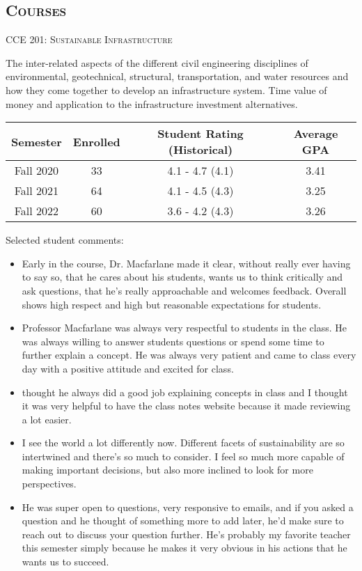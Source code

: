 \documentclass[margin,line]{res}
\newif\ifdetail
\newcommand{\secfont}{\scshape }
\newcommand{\acc}{\scshape }
\begin{document}
\begin{resume}
\section{\secfont Courses}

{\acc CCE 201: Sustainable Infrastructure}

\vspace{-.4cm}
The inter-related aspects of the different civil engineering disciplines of
environmental, geotechnical, structural, transportation, and water resources and
how they come together to develop an infrastructure system. Time value of money
and application to the infrastructure investment alternatives.


\ifdetail
\begin{tabular}{cccc}
  \toprule
  Semester & Enrolled & Student Rating (Historical) & Average GPA\\
  \midrule
  Fall 2020 & 33 & 4.1 - 4.7 (4.1)& 3.41 \\
  Fall 2021 & 64 & 4.1 - 4.5 (4.3)& 3.25 \\
  Fall 2022 & 60 & 3.6 - 4.2 (4.3)& 3.26 \\
  \bottomrule
\end{tabular}

Selected student comments:
\begin{itemize}
  \item Early in the course, Dr. Macfarlane made it clear, without really ever
    having to say so, that he cares about his students, wants us to think
    critically and ask questions, that he's really approachable and welcomes
    feedback. Overall shows high respect and high but reasonable expectations
    for students.
  \item Professor Macfarlane was always very respectful to students in the class. He
    was always willing to answer students questions or spend some time to
    further explain a concept. He was always very patient and came to class
    every day with a positive attitude and excited for class.
  \item thought he always did a good job explaining concepts in class and I thought it was very helpful to have the class notes website because it made reviewing a lot easier.
  \item I see the world a lot differently now. Different facets of sustainability are so intertwined and there's so much to consider. I feel so much more capable of making important decisions, but also more inclined to look for more perspectives.
  \item He was super open to questions, very responsive to emails, and if you asked a question and he thought of something more to add later, he'd make sure to reach out to discuss your question further. He's probably my favorite teacher this semester simply because he makes it very obvious in his actions that he wants us to succeed.
\end{itemize}



\end{resume}
\end{document}
